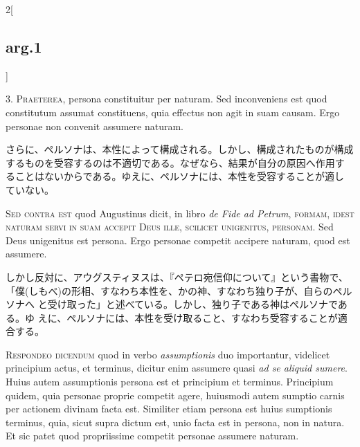 \documentclass[paper=a4paper,fontsize=10pt,jafontsize=9pt,titlepage]{jlreq}
\begin{document}
\begin{paracol}{2}[\subsection{arg.1}]

3. {\scshape Praeterea}, persona constituitur per naturam. Sed inconveniens est quod
constitutum assumat constituens, quia effectus non agit in suam
causam. Ergo personae non convenit assumere naturam.

\switchcolumn

さらに、ペルソナは、本性によって構成される。しかし、構成されたものが構成
 するものを受容するのは不適切である。なぜなら、結果が自分の原因へ作用す
 ることはないからである。ゆえに、ペルソナには、本性を受容することが適し
 ていない。

\switchcolumn*[\subsection{s.c.}]

{\scshape Sed contra est} quod Augustinus dicit, in libro {\itshape de Fide ad Petrum},
{\scshape formam, idest naturam servi in suam accepit Deus ille, scilicet
unigenitus, personam}. Sed Deus unigenitus est persona. Ergo personae
competit accipere naturam, quod est assumere.

\switchcolumn

しかし反対に、アウグスティヌスは、『ペテロ宛信仰について』という書物で、
 「僕(しもべ)の形相、すなわち本性を、かの神、すなわち独り子が、自らのペルソナへ
 と受け取った」と述べている。しかし、独り子である神はペルソナである。ゆ
 えに、ペルソナには、本性を受け取ること、すなわち受容することが適合する。


{\scshape Respondeo dicendum} quod in verbo {\itshape assumptionis} duo importantur, videlicet
principium actus, et terminus, dicitur enim assumere quasi {\itshape ad se aliquid
sumere}. Huius autem assumptionis persona est et principium et
terminus. Principium quidem, quia personae proprie competit agere,
huiusmodi autem sumptio carnis per actionem divinam facta est. Similiter
etiam persona est huius sumptionis terminus, quia, sicut supra dictum
est, unio facta est in persona, non in natura. Et sic patet quod
propriissime competit personae assumere naturam.

\switchcolumn


\end{paracol}
\end{document}
